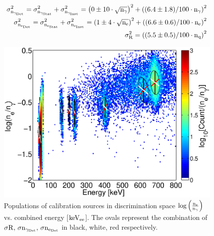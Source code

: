 \begin{equation}
\begin{split}
\rm  \sigma_{n_{\gamma_{Det}}}^2 = \sigma_{n_{\gamma_{Stat}}}^2 + \sigma_{n_{\gamma_{Inst}}}^2 =\left(0 \pm10\cdot \sqrt{n_\gamma}\right)^2 + \left((6.4\pm1.8)/100\cdot n_\gamma\right)^2 \\
\rm \sigma_{n_{e_{Det}}}^2 = \sigma_{n_{e_{Stat}}}^2 + \sigma_{n_{e_{Inst}}}^2 = \left(1\pm4\cdot \sqrt{n_e}\right)^2 + \left((6.6\pm0.6)/100\cdot n_e\right)^2 \\
\rm \sigma_R^2=   \left((5.5\pm0.5)/100\cdot n_q\right)^2
\label{eq:Inst_Fit}
\end{split}
\end{equation}

 \begin{figure}[h!]\centering
\includegraphics[width=120mm]{Recombination_LY_QY/Figures/All_disc.eps}
\caption{Populations of calibration sources in discrimination space $\rm log\left(\frac{n_e}{n_\gamma}\right) $ vs. combined energy [$\rm keV_{ee}$]. The ovals represent the combination of $\rm \sigma R, \, \sigma n_{\gamma_{Det}}, \,\sigma n_{e_{Det}} $ in black, white, red respectively.}
\label{fig:E_dis}
\end{figure}

